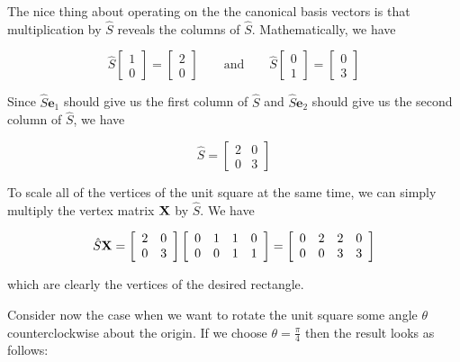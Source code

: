 \documentclass[12pt]{article}
\newcommand{\nin}{\noindent}
\newcommand{\vthree}{\vspace{3mm}}
\newcommand{\mymat}[1]{
\left[
\begin{array}{rrrrrrrrrrrrrrrrrrrrrrrrrrrrrrrrrrrrrrr}
#1
\end{array}
\right]
}
\newcommand{\be}{\mathbf{e}}
\begin{document}
\nin The nice thing about operating on the the canonical basis vectors is that multiplication by $\hat{S}$ reveals the columns of $\hat{S}$.  Mathematically, we have


\[
\hat{S}\mymat{1 \\ 0} = \mymat{2 \\ 0}
\quad \quad \textrm{and} \quad \quad
\hat{S}\mymat{0 \\ 1} = \mymat{0 \\ 3}
\]

\vthree

\nin Since $\hat{S}\be_1$ should give us the first column of $\hat{S}$ and $\hat{S}\be_2$ should give us the second column of $\hat{S}$, we have

\[
\hat{S} =
\mymat{
2 & 0 \\
0 & 3
}
\]

\vthree

\nin To scale all of the vertices of the unit square at the same time, we can simply multiply the vertex matrix ${\bf X}$ by $\hat{S}$.  We have

\[
\hat{S}{\bf X} =
\mymat{
2 & 0 \\
0 & 3
}
\mymat{
0 & 1 & 1 & 0 \\
0 & 0 & 1 & 1 \\
}
=
\mymat{
0 & 2 & 2 & 0 \\
0 & 0 & 3 & 3 \\
}
\]

\vthree

\nin which are clearly the vertices of the desired rectangle.


\clearpage

\nin {\bf Rotations}

\vthree

\nin Consider now the case when we want to rotate the unit square some angle $\theta$ counterclockwise about the origin.  If we choose $\theta = \frac{\pi}{4}$ then the result looks as follows:

\vthree

\vspace{10mm}
\end{document}
